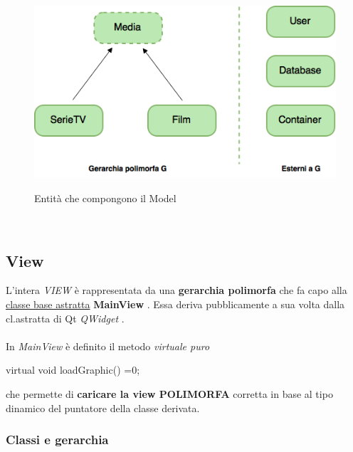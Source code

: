 \documentclass[10pt,a4paper,openany]{article}
\begin{document}
	
		\begin{figure}
			\centering
			\includegraphics[angle=0,scale=.60]{Model.png}\\
			\caption{Entità che compongono il Model}
			\label{fig:Model}
		\end{figure}
		
	\newpage
	\ \vspace{25pt}
	
	
	
	\subsection{View}
	
	L'intera \emph{VIEW} è rappresentata da una \textbf{gerarchia polimorfa} che fa capo alla \underline{classe base astratta} \textbf{MainView} .
	Essa deriva pubblicamente a sua volta dalla cl.astratta di Qt \emph{QWidget} .\\\\
	In \emph{MainView} è definito il metodo \textit{virtuale puro} 
	\begin{CPP}
		virtual void loadGraphic() =0;
	\end{CPP}
	che permette di \textbf{caricare la view POLIMORFA} corretta in base al tipo dinamico del puntatore della classe derivata.
	
		\subsubsection{Classi e gerarchia }
\end{document}
